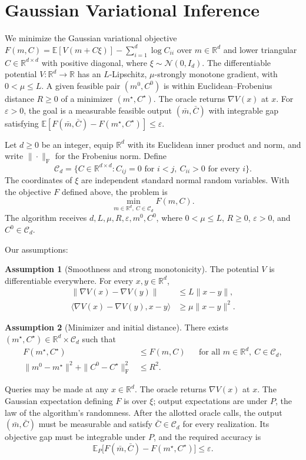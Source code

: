 \documentclass[10pt]{article}
\theoremstyle{definition}
\newtheorem{assumption}{Assumption}
\begin{document}
\section*{Gaussian Variational Inference}
We minimize the Gaussian variational objective $F(m,C)=\mathbb{E}[V(m+C\xi)]-\sum_{i=1}^d\log C_{ii}$ over $m\in\mathbb{R}^d$ and lower triangular $C\in\mathbb{R}^{d\times d}$ with positive diagonal, where $\xi\sim\mathcal{N}(0,I_d)$. The differentiable potential $V:\mathbb{R}^d\to\mathbb{R}$ has an $L$-Lipschitz, $\mu$-strongly monotone gradient, with $0<\mu\leq L$. A given feasible pair $(m^0,C^0)$ is within Euclidean--Frobenius distance $R\geq0$ of a minimizer $(m^\star,C^\star)$. The oracle returns $\nabla V(x)$ at $x$. For $\varepsilon>0$, the goal is a measurable feasible output $(\bar m,\bar C)$ with integrable gap satisfying $\mathbb{E}[F(\bar m,\bar C)-F(m^\star,C^\star)]\leq\varepsilon$.

Let $d\geq0$ be an integer, equip $\mathbb{R}^d$ with its Euclidean inner product and norm, and write $\|\cdot\|_{\mathrm F}$ for the Frobenius norm. Define
\[
\mathcal{C}_d=\{C\in\mathbb{R}^{d\times d}: C_{ij}=0\text{ for }i<j,\ C_{ii}>0\text{ for every }i\}.
\]
The coordinates of $\xi$ are independent standard normal random variables. With the objective $F$ defined above, the problem is
\[
\min_{m\in\mathbb{R}^d,\ C\in\mathcal{C}_d} F(m,C).
\]
The algorithm receives $d,L,\mu,R,\varepsilon,m^0,C^0$, where $0<\mu\leq L$, $R\geq0$, $\varepsilon>0$, and $C^0\in\mathcal{C}_d$.

Our assumptions:
\begin{assumption}[Smoothness and strong monotonicity]
The potential $V$ is differentiable everywhere. For every $x,y\in\mathbb{R}^d$,
\[
\begin{aligned}
\|\nabla V(x)-\nabla V(y)\|&\leq L\|x-y\|,\\
\langle\nabla V(x)-\nabla V(y),x-y\rangle&\geq\mu\|x-y\|^2.
\end{aligned}
\]
\end{assumption}

\begin{assumption}[Minimizer and initial distance]
There exists $(m^\star,C^\star)\in\mathbb{R}^d\times\mathcal{C}_d$ such that
\[
\begin{aligned}
F(m^\star,C^\star)&\leq F(m,C)
&&\text{for all }m\in\mathbb{R}^d,\ C\in\mathcal{C}_d,\\
\|m^0-m^\star\|^2+\|C^0-C^\star\|_{\mathrm F}^2&\leq R^2.
\end{aligned}
\]
\end{assumption}

Queries may be made at any $x\in\mathbb{R}^d$. The oracle returns $\nabla V(x)$ at $x$. The Gaussian expectation defining $F$ is over $\xi$; output expectations are under $P$, the law of the algorithm's randomness. After the allotted oracle calls, the output $(\bar m,\bar C)$ must be measurable and satisfy $\bar C\in\mathcal{C}_d$ for every realization. Its objective gap must be integrable under $P$, and the required accuracy is
\[
\mathbb{E}_{P}\bigl[F(\bar m,\bar C)-F(m^\star,C^\star)\bigr]
\leq\varepsilon.
\]
\end{document}

